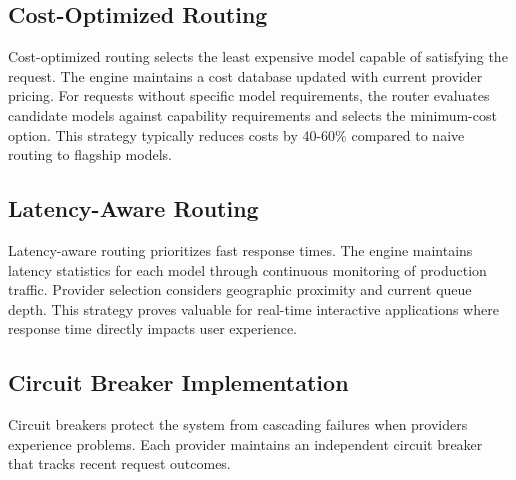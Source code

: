 \documentclass[12pt,a4paper,twoside]{report}
\begin{document}
\subsection{Cost-Optimized Routing}

Cost-optimized routing selects the least expensive model capable of satisfying the request. The engine maintains a cost database updated with current provider pricing. For requests without specific model requirements, the router evaluates candidate models against capability requirements and selects the minimum-cost option. This strategy typically reduces costs by 40-60\% compared to naive routing to flagship models.

\subsection{Latency-Aware Routing}

Latency-aware routing prioritizes fast response times. The engine maintains latency statistics for each model through continuous monitoring of production traffic. Provider selection considers geographic proximity and current queue depth. This strategy proves valuable for real-time interactive applications where response time directly impacts user experience.

\subsection{Circuit Breaker Implementation}

Circuit breakers protect the system from cascading failures when providers experience problems. Each provider maintains an independent circuit breaker that tracks recent request outcomes.
\end{document}
